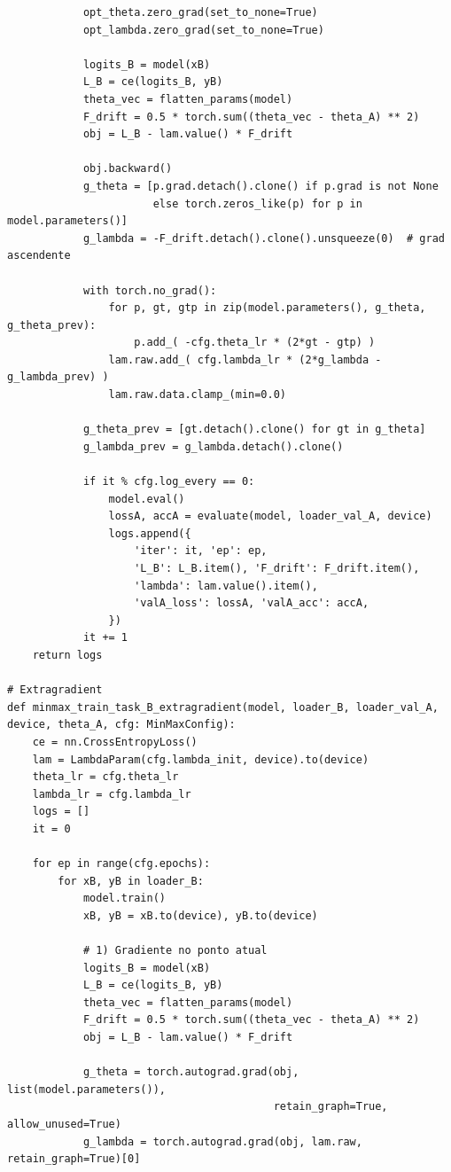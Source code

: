 \documentclass[9pt,a4paper]{extarticle}
\begin{document}
\begin{lstlisting}
            opt_theta.zero_grad(set_to_none=True)
            opt_lambda.zero_grad(set_to_none=True)

            logits_B = model(xB)
            L_B = ce(logits_B, yB)
            theta_vec = flatten_params(model)
            F_drift = 0.5 * torch.sum((theta_vec - theta_A) ** 2)
            obj = L_B - lam.value() * F_drift

            obj.backward()
            g_theta = [p.grad.detach().clone() if p.grad is not None
                       else torch.zeros_like(p) for p in model.parameters()]
            g_lambda = -F_drift.detach().clone().unsqueeze(0)  # grad ascendente

            with torch.no_grad():
                for p, gt, gtp in zip(model.parameters(), g_theta, g_theta_prev):
                    p.add_( -cfg.theta_lr * (2*gt - gtp) )
                lam.raw.add_( cfg.lambda_lr * (2*g_lambda - g_lambda_prev) )
                lam.raw.data.clamp_(min=0.0)

            g_theta_prev = [gt.detach().clone() for gt in g_theta]
            g_lambda_prev = g_lambda.detach().clone()

            if it % cfg.log_every == 0:
                model.eval()
                lossA, accA = evaluate(model, loader_val_A, device)
                logs.append({
                    'iter': it, 'ep': ep,
                    'L_B': L_B.item(), 'F_drift': F_drift.item(),
                    'lambda': lam.value().item(),
                    'valA_loss': lossA, 'valA_acc': accA,
                })
            it += 1
    return logs

# Extragradient
def minmax_train_task_B_extragradient(model, loader_B, loader_val_A, device, theta_A, cfg: MinMaxConfig):
    ce = nn.CrossEntropyLoss()
    lam = LambdaParam(cfg.lambda_init, device).to(device)
    theta_lr = cfg.theta_lr
    lambda_lr = cfg.lambda_lr
    logs = []
    it = 0

    for ep in range(cfg.epochs):
        for xB, yB in loader_B:
            model.train()
            xB, yB = xB.to(device), yB.to(device)

            # 1) Gradiente no ponto atual
            logits_B = model(xB)
            L_B = ce(logits_B, yB)
            theta_vec = flatten_params(model)
            F_drift = 0.5 * torch.sum((theta_vec - theta_A) ** 2)
            obj = L_B - lam.value() * F_drift

            g_theta = torch.autograd.grad(obj, list(model.parameters()),
                                          retain_graph=True, allow_unused=True)
            g_lambda = torch.autograd.grad(obj, lam.raw, retain_graph=True)[0]


\end{lstlisting}
\end{document}
